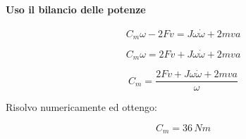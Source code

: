 \documentclass[main.tex]{subfiles}
\begin{document}
\paragraph{Uso il bilancio delle potenze}

\begin{equation}
	C_m\omega-2Fv =  J\omega\dot{\omega} + 2mva
\end{equation}

\begin{equation}
	C_m\omega =  2Fv + J\omega\dot{\omega} + 2mva
\end{equation}

\begin{equation}
	C_m = \dfrac{2Fv + J\omega\dot{\omega} + 2mva}{\omega}
\end{equation}

Risolvo numericamente ed ottengo:

\begin{equation}
	C_m = 36\,Nm
\end{equation}
\end{document}
